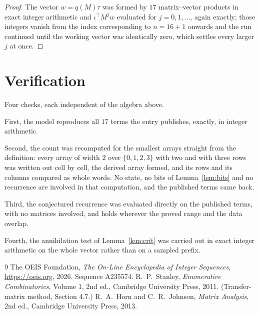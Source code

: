 \documentclass[11pt,a4paper]{article}
\theoremstyle{plain}
\theoremstyle{definition}
\begin{document}
\begin{proof}
The vector $w=q(M)\tau$ was formed by $17$ matrix--vector products in exact integer
arithmetic and $\iota^{\!\top}M^{j}w$ evaluated for $j=0,1,\dots$, again exactly; those
integers vanish from the index corresponding to $n=16+1$ onwards and the run continued
until the working vector was identically zero, which settles every larger $j$ at once.
\end{proof}

\section{Verification}

Four checks, each independent of the algebra above.

First, the model reproduces all $17$ terms the entry publishes, exactly, in integer
arithmetic.

Second, the count was recomputed for the smallest arrays straight from the definition: every
array of width $2$ over $\{0,1,2,3\}$ with two and with three rows was written out cell by cell,
the derived array formed, and its rows and its columns compared as whole words. No state, no
bits of Lemma~\ref{lem:bits} and no recurrence are involved in that computation, and the
published terms came back.

Third, the conjectured recurrence was evaluated directly on the published terms, with no
matrices involved, and holds wherever the proved range and the data overlap.

Fourth, the annihilation test of Lemma~\ref{lem:crit} was carried out in exact integer
arithmetic on the whole vector rather than on a sampled prefix.

\begin{thebibliography}{9}
 The OEIS Foundation, \emph{The On-Line Encyclopedia of Integer
Sequences}, \url{https://oeis.org}, 2026. Sequence A235574.
 R.~P.~Stanley, \emph{Enumerative Combinatorics}, Volume 1, 2nd ed.,
Cambridge University Press, 2011. (Transfer-matrix method, Section 4.7.)
 R.~A.~Horn and C.~R.~Johnson, \emph{Matrix Analysis}, 2nd ed., Cambridge
University Press, 2013.
\end{thebibliography}
\end{document}
